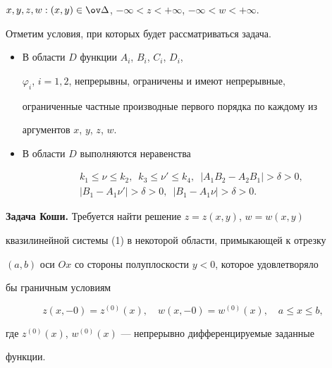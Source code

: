 $x,y,z,w:(x,y)\in\ov\Delta$, $-\infty<z<+\infty$, $-\infty<w<+\infty$. 


 


Отметим условия, при которых будет рассматриваться задача. 


\begin{itemize} 


\item[a)] В области $D$ функции $A_i$, $B_i$, $C_i$, $D_i$, 


$\varphi_i$, $i=1,2$, непрерывны, ограничены и имеют непрерывные, 


ограниченные частные производные первого порядка по каждому из 


аргументов $x$, $y$, $z$, $w$. 


\item[b)] В области $D$ выполняются неравенства 


\begin{gather*} 


k_1\le\nu\le k_2,\ \; k_3\le\nu'\le k_4, 


\ \; |A_1B_2-A_2B_1|>\delta>0,\\ 


|B_1-A_1\nu'|>\delta>0,\ \; |B_1-A_1\nu|>\delta>0. 


\end{gather*} 


\end{itemize} 


 


{\bf Задача Коши.} Требуется найти решение $z=z(x,y)$, $w=w(x,y)$ 


квазилинейной системы (1) в некоторой области, примыкающей к отрезку 


$(a,b)$ оси $Ox$ со стороны полуплоскости $y<0$, которое удовлетворяло 


бы граничным условиям 


\begin{equation} 


z(x,-0)=z^{(0)}(x),\quad w(x,-0)=w^{(0)}(x),\quad 


a\le x\le b, 


\end{equation} 


где $z^{(0)}(x)$, $w^{(0)}(x)$ --- непрерывно дифференцируемые заданные 


функции. 


\medskip 


